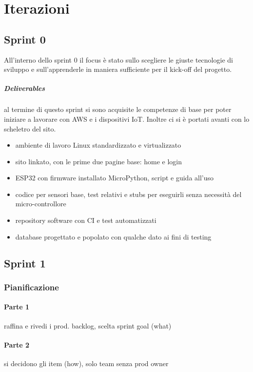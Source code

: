 \chapter{Iterazioni}

\section{Sprint 0}
All'interno dello sprint 0 il focus è stato sullo scegliere le giuste tecnologie di sviluppo e sull'apprenderle in maniera sufficiente per il kick-off del progetto.

\paragraph{Deliverables} al termine di questo sprint si sono acquisite le competenze di base per poter iniziare a lavorare con AWS e i dispositivi IoT. Inoltre ci si è portati avanti con lo scheletro del sito.
\begin{itemize}
    \item ambiente di lavoro Linux standardizzato e virtualizzato
    \item sito linkato, con le prime due pagine base: home e login
    \item ESP32 con firmware installato MicroPython, script e guida all'uso
    \item codice per sensori base, test relativi e stubs per eseguirli senza necessità del micro-controllore
    \item repository software con CI e test automatizzati 
    \item database progettato e popolato con qualche dato ai fini di testing
    
\end{itemize}

\section{Sprint 1}
    \subsection{Pianificazione}
        \subsubsection{Parte 1} 
            raffina e rivedi i prod. backlog, scelta sprint goal (what)
        \subsubsection{Parte 2}
            si decidono gli item (how), solo team senza prod owner
